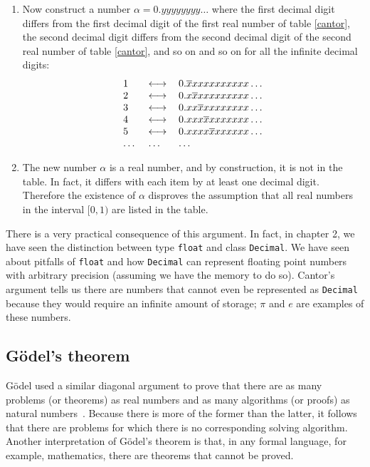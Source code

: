 \documentclass[justified,sixbynine]{tufte-book}
\def\ft{\small\tt}
\theoremstyle{plain}%
\theoremstyle{definition}
\theoremstyle{remark}
\begin{document}
\begin{fullwidth}
\begin{enumerate}
\item  Now construct a number $\alpha =0.yyyyyyyy\dots$ where the first
decimal digit differs from the first decimal digit of the first real number
of table \ref{cantor}, the second decimal digit differs from the second
decimal digit of the second real number of table \ref{cantor}, and so on and
so on for all the infinite decimal digits:
\begin{equation}
\begin{tabular}{lll}
1 & $\longleftrightarrow $ & $0.\overline{x}xxxxxxxxxx\dots$ \\
2 & $\longleftrightarrow $ & $0.x\overline{x}xxxxxxxxx\dots$ \\
3 & $\longleftrightarrow $ & $0.xx\overline{x}xxxxxxxx\dots$ \\
4 & $\longleftrightarrow $ & $0.xxx\overline{x}xxxxxxx\dots$ \\
5 & $\longleftrightarrow $ & $0.xxxx\overline{x}xxxxxx\dots$ \\
\dots & \dots &\dots 
\end{tabular}
\label{cantor2}
\end{equation}

\item  The new number $\alpha $ is a real number, and by construction, it is
not in the table. In fact, it differs with each item by at least one decimal
digit. Therefore the existence of $\alpha $ disproves the assumption that
all real numbers in the interval $[0,1)$ are listed in the table.
\end{enumerate}

There is a very practical consequence of this argument. In fact, in chapter 2, we have seen the distinction between type {\ft float} and class {\ft Decimal}. We have seen about pitfalls of {\ft float} and how {\ft Decimal} can represent floating point numbers with arbitrary precision (assuming we have the memory to do so). Cantor's argument tells us there are numbers that cannot even be represented as {\ft Decimal} because they would require an infinite amount of storage; $\pi$ and $e$ are examples of these numbers.

\subsection{G\"odel's theorem}


G\"odel used a similar diagonal argument to prove that there are as many
problems (or theorems) as real numbers and as many algorithms (or proofs) as
natural numbers~\cite{hofstadter}. Because there is more of the former than the latter, it
follows that there are problems for which there is no corresponding solving
algorithm. Another interpretation of G\"odel's theorem is that, in any formal
language, for example, mathematics, there are theorems that cannot be proved.


\end{fullwidth}
\end{document}
